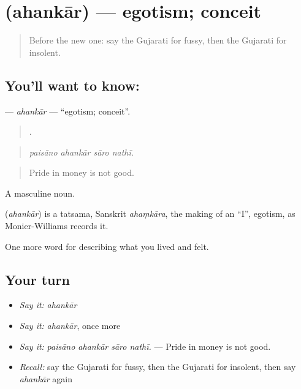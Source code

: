 \section[\texorpdfstring{\gu{અહંકાર} (ahankār)}{અહંકાર (ahankār)}]{ (ahankār) — egotism; conceit}

\label{lesson:GU-C465-ahankar}



\begin{quote}
Before the new one: say the Gujarati for fussy, then the Gujarati for insolent.
\end{quote}

\subsection*{You'll want to know: }
\textbf{} — \emph{ahankār} — \textquotedblleft{}egotism; conceit\textquotedblright{}.

\begin{quote}
   .
\end{quote}

\begin{quote}
\emph{paisāno ahankār sāro nathī.}
\end{quote}

\begin{quote}
Pride in money is not good.
\end{quote}

A masculine noun.

\begin{cousinweb}
\textbf{} (\emph{ahankār}) is a tatsama, Sanskrit \emph{ahaṃkāra}, the making of an \textquotedblleft{}I\textquotedblright{}, egotism, as Monier-Williams records it.
\end{cousinweb}

\begin{grammarlens}[title={What you've built}]
One more word for describing what you lived and felt.
\end{grammarlens}

\subsection*{Your turn}
\begin{itemize}
\raggedright
  \item \emph{Say it:} \emph{ahankār}
  \item \emph{Say it:} \emph{ahankār}, once more
  \item \emph{Say it:} \emph{paisāno ahankār sāro nathī.} — Pride in money is not good.
  \item \emph{Recall:} say the Gujarati for fussy, then the Gujarati for insolent, then say \emph{ahankār} again
\end{itemize}

